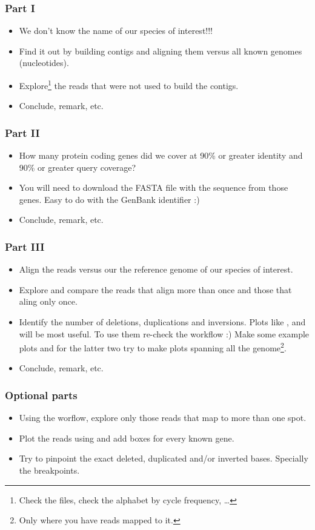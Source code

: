 \begin{frame}[allowframebreaks]
  \frametitle{Part I}
  \begin{itemize}
  \item We don't know the \alert{name} of our species of interest!!!
  \item Find it out by building contigs and aligning them versus all known genomes (nucleotides).
  \item Explore\footnote{Check the files, check the alphabet by cycle frequency, \ldots} the reads that were not used to build the contigs.
  \item Conclude, remark, etc.
  \end{itemize}
\end{frame}

\begin{frame}[allowframebreaks]
  \frametitle{Part II}
  \begin{itemize}
  \item How many \alert{protein coding genes} did we cover at 90\% or greater identity and 90\% or greater query coverage?
  \item You will need to download the FASTA file with the sequence from those genes. Easy to do with the GenBank identifier :)
  \item Conclude, remark, etc.
  \end{itemize}
\end{frame}

\begin{frame}[allowframebreaks]
  \frametitle{Part III}
  \begin{itemize}
  \item Align the reads versus our the reference genome of our species of interest.
  \item Explore and compare the reads that align more than once and those that aling only once.
  \item Identify the number of deletions, duplications and inversions. Plots like ,  and  will be most useful. To use  them re-check the  workflow :) Make some example plots and for the latter two try to make plots spanning all the genome\footnote{Only where you have reads mapped to it.}.
  \item Conclude, remark, etc.
  \end{itemize}
\end{frame}

\begin{frame}[allowframebreaks]
  \frametitle{Optional parts}
  \begin{itemize}
  \item Using the  worflow, explore only those reads that map to more than one spot.
  \item Plot the reads using  and add boxes for every known gene.
  \item Try to pinpoint the exact deleted, duplicated and/or inverted bases. Specially the breakpoints.
  \end{itemize}
\end{frame}

